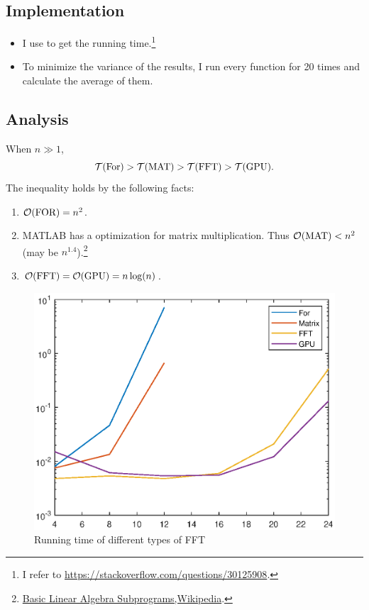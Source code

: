 \documentclass{article}
\begin{document}
\title{}
\subsection*{Implementation}
\begin{itemize}
	\item 
		I use  to get the running time.\footnote{I refer to \href{https://stackoverflow.com/questions/30125908}{https://stackoverflow.com/questions/30125908}.}
	\item 
		To minimize the variance of the results, I run every function for 20 times and calculate the average of them.
\end{itemize}

\subsection*{Analysis}

When $n\gg 1$,
\[
	\mathcal{T}(\text{For})>\mathcal{T}(\text{MAT})>\mathcal{T}(\text{FFT})>\mathcal{T}(\text{GPU})
.\] 
The inequality holds by the following facts:
\begin{enumerate}
	\item $\mathcal{O}(\text{FOR})=n^2$.
	\item MATLAB has a optimization for matrix multiplication. Thus $\mathcal{O}(\text{MAT})<n^2$ (may be $n^{1.4}$).\footnote{\href{https://en.wikipedia.org/wiki/Basic_Linear_Algebra_Subprograms}{Basic Linear Algebra Subprograms,Wikipedia}.}
	\item $\mathcal{O}(\text{FFT})=\mathcal{O}(\text{GPU})=n\log(n)$.
\end{enumerate}
\begin{figure}[H]
	\centering
	\includegraphics{../P3.eps}
	\caption{Running time of different types of FFT}
\end{figure}
\end{document}
